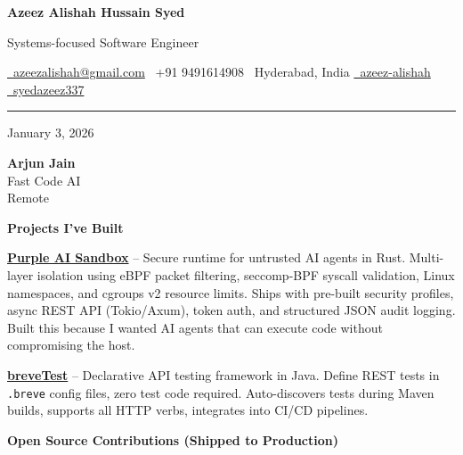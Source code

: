 \documentclass[10pt,letterpaper]{article}
\begin{document}
\begin{center}
    {\LARGE\bfseries\color{primary}Azeez Alishah Hussain Syed}

    \vspace{2pt}
    {\color{secondary}Systems-focused Software Engineer}

    \vspace{6pt}
    {\small
    \href{mailto:azeezalishah@gmail.com}{\faEnvelope\ azeezalishah@gmail.com} \quad
    \faPhone\ +91 9491614908 \quad
    \faMapMarker*\ Hyderabad, India \quad
    \href{https://linkedin.com/in/azeez-alishah}{\faLinkedin\ azeez-alishah} \quad
    \href{https://github.com/syedazeez337}{\faGithub\ syedazeez337}
    }
\end{center}

\vspace{4pt}
\hrule
\vspace{8pt}

\noindent
\begin{minipage}[t]{0.5\textwidth}
{\color{secondary}January 3, 2026}
\end{minipage}%
\begin{minipage}[t]{0.5\textwidth}
\raggedleft
\textbf{Arjun Jain}\\
Fast Code AI\\
Remote
\end{minipage}

\vspace{14pt}

\textbf{Projects I've Built}

\textbf{\href{https://github.com/syedazeez337/purple-ai-sandbox}{Purple AI Sandbox}} -- Secure runtime for untrusted AI agents in Rust. Multi-layer isolation using eBPF packet filtering, seccomp-BPF syscall validation, Linux namespaces, and cgroups v2 resource limits. Ships with pre-built security profiles, async REST API (Tokio/Axum), token auth, and structured JSON audit logging. Built this because I wanted AI agents that can execute code without compromising the host.

\textbf{\href{https://github.com/Brevetest/core}{breveTest}} -- Declarative API testing framework in Java. Define REST tests in \texttt{.breve} config files, zero test code required. Auto-discovers tests during Maven builds, supports all HTTP verbs, integrates into CI/CD pipelines.

\vspace{6pt}
\textbf{Open Source Contributions (Shipped to Production)}
\end{document}
